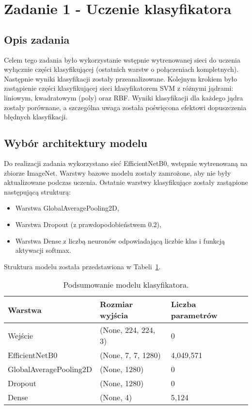 \section{Zadanie 1 - Uczenie klasyfikatora}

\subsection{Opis zadania}
Celem tego zadania było wykorzystanie wstępnie wytrenowanej sieci do uczenia wyłącznie części klasyfikującej (ostatnich warstw o połączeniach kompletnych). Następnie wyniki klasyfikacji zostały przeanalizowane. Kolejnym krokiem było zastąpienie części klasyfikującej sieci klasyfikatorem SVM z różnymi jądrami: liniowym, kwadratowym (poly) oraz RBF. Wyniki klasyfikacji dla każdego jądra zostały porównane, a szczególna uwaga została poświęcona efektowi dopuszczenia błędnych klasyfikacji.

\subsection{Wybór architektury modelu}
Do realizacji zadania wykorzystano sieć EfficientNetB0, wstępnie wytrenowaną na zbiorze ImageNet. Warstwy bazowe modelu zostały zamrożone, aby nie były aktualizowane podczas uczenia. Ostatnie warstwy klasyfikujące zostały zastąpione następującą strukturą:
\begin{itemize}
    \item Warstwa GlobalAveragePooling2D,
    \item Warstwa Dropout (z prawdopodobieństwem $0.2$),
    \item Warstwa Dense z liczbą neuronów odpowiadającą liczbie klas i funkcją aktywacji softmax.
\end{itemize}

\noindent Struktura modelu została przedstawiona w Tabeli~\ref{tab:model_summary}.
\begin{table}[h!]
\centering
\begin{tabular}{|l|l|l|}
\hline
\textbf{Warstwa}                  & \textbf{Rozmiar wyjścia}       & \textbf{Liczba parametrów} \\ \hline
Wejście                          & (None, 224, 224, 3)           & 0                          \\ \hline
EfficientNetB0                   & (None, 7, 7, 1280)            & 4,049,571                  \\ \hline
GlobalAveragePooling2D           & (None, 1280)                  & 0                          \\ \hline
Dropout                          & (None, 1280)                  & 0                          \\ \hline
Dense                            & (None, 4)                     & 5,124                      \\ \hline
\end{tabular}
\caption{Podsumowanie modelu klasyfikatora.}
\label{tab:model_summary}
\end{table}

